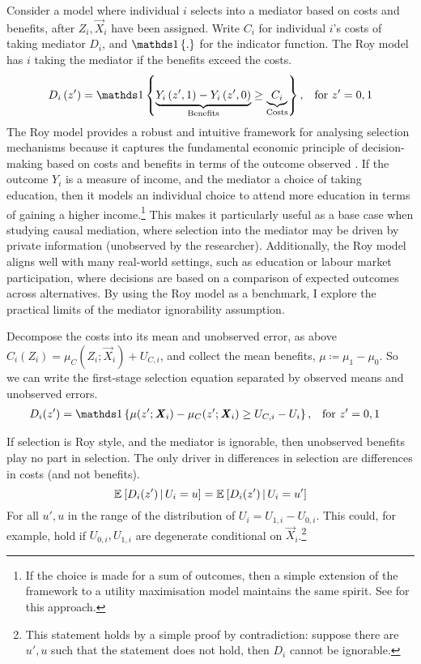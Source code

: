 Consider a model where individual $i$ selects into a mediator based on costs and benefits, after $Z_i, \vec X_i$ have been assigned.
Write $C_i$ for individual $i$'s costs of taking mediator $D_i$, and $\indicator{.}$ for the indicator function.
The Roy model has $i$ taking the mediator if the benefits exceed the costs.
\[ D_i \left( z' \right) = \indicator{
    \underbrace{Y_i\left( z', 1 \right) - Y_i\left( z', 0 \right)}_{\text{Benefits}}
    \geq \underbrace{C_i}_{\text{Costs}}}, \;\;\; \text{for } z'=0,1 \]
The Roy model provides a robust and intuitive framework for analysing selection mechanisms because it captures the fundamental economic principle of decision-making based on costs and benefits in terms of the outcome observed \citep{roy1951some,heckman1990empirical}.
If the outcome $Y_i$ is a measure of income, and the mediator a choice of taking education, then it models an individual choice to attend more education in terms of gaining a higher income.\footnote{
    If the choice is made for a sum of outcomes, then a simple extension of the framework to a utility maximisation model maintains the same spirit.
    See \cite{heckman1990empirical} for this approach.
}
This makes it particularly useful as a base case when studying causal mediation, where selection into the mediator may be driven by private information (unobserved by the researcher).
Additionally, the Roy model aligns well with many real-world settings, such as education or labour market participation, where decisions are based on a comparison of expected outcomes across alternatives.  
By using the Roy model as a benchmark, I explore the practical limits of the mediator ignorability assumption.

Decompose the costs into its mean and unobserved error, as above $C_i(Z_i) = \mu_{C}(Z_i; \vec X_i) + U_{C,i}$, and collect the mean benefits, $\mu \coloneqq \mu_1 - \mu_0$.
So we can write the first-stage selection equation separated by observed means and unobserved errors.
\begin{align*}
    D_i(z') &= \indicator{
        \mu(z'; \vec X_i) - \mu_C(z'; \vec X_i) \geq U_{C,i} - U_i }
        , \;\;\; \text{for } z'=0,1
\end{align*}

If selection is Roy style, and the mediator is ignorable, then unobserved benefits play no part in selection.
The only driver in differences in selection are differences in costs (and not benefits).
\[ \mathbb{E}_{} \left[  D_i(z')  \, \middle\vert \,  U_i = u \right] = \mathbb{E}_{} \left[  D_i(z')  \, \middle\vert \,  U_i = u' \right] \]
For all $u', u$ in the range of the distribution of $U_i = U_{1,i} - U_{0,i}$.
This could, for example, hold if $U_{0,i}, U_{1,i}$ are degenerate conditional on $\vec X_i$.\footnote{
    This statement holds by a simple proof by contradiction: suppose there are $u', u$ such that the statement does not hold, then $D_i$ cannot be ignorable.
}

